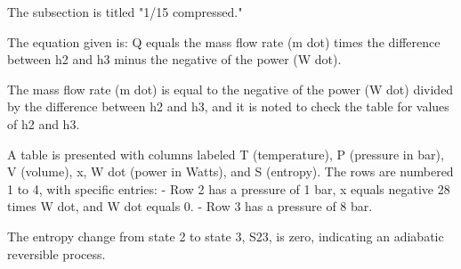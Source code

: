 The subsection is titled "1/15 compressed."

The equation given is:
Q equals the mass flow rate (m dot) times the difference between h2 and h3 minus the negative of the power (W dot).

The mass flow rate (m dot) is equal to the negative of the power (W dot) divided by the difference between h2 and h3, and it is noted to check the table for values of h2 and h3.

A table is presented with columns labeled T (temperature), P (pressure in bar), V (volume), x, W dot (power in Watts), and S (entropy). The rows are numbered 1 to 4, with specific entries:
- Row 2 has a pressure of 1 bar, x equals negative 28 times W dot, and W dot equals 0.
- Row 3 has a pressure of 8 bar.

The entropy change from state 2 to state 3, S23, is zero, indicating an adiabatic reversible process.
